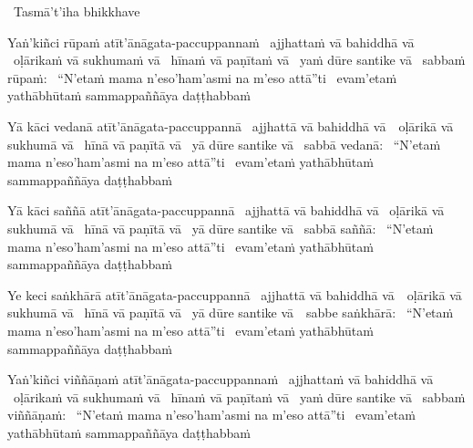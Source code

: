 \begin{pali-leader}
  \anglebracketleft\ \hspace{-0.5mm}Tasmā't'iha bhikkhave \hspace{-0.5mm}\anglebracketright\
\end{pali-leader}
\begin{pali-hangtogether}
  Yaṅ'kiñci rūpaṁ atīt'ānāgata-paccuppannaṁ \breathmark\ ajjhattaṁ vā bahiddhā vā \breathmark\ oḷārikaṁ vā sukhumaṁ vā \breathmark\ hīnaṁ vā paṇītaṁ vā \breathmark\ yaṁ dūre santike vā \breathmark\ sabbaṁ rūpaṁ: \breathmark\ ``N'etaṁ mama n'eso'ham'asmi na m'eso attā''ti \breathmark\ evam'etaṁ yathābhūtaṁ sammappaññāya daṭṭhabbaṁ
\end{pali-hangtogether}

\begin{pali-hang}
  Yā kāci vedanā atīt'ānāgata-paccuppannā \breathmark\ ajjhattā vā bahiddhā \mbox{vā}~\breathmark\ oḷārikā vā sukhumā vā \breathmark\ hīnā vā paṇītā vā \breathmark\ yā dūre santike vā \breathmark\ sabbā vedanā: \breathmark\ ``N'etaṁ mama n'eso'ham'asmi na m'eso attā''ti \breathmark\ evam'etaṁ yathābhūtaṁ sammappaññāya daṭṭhabbaṁ
\end{pali-hang}

\begin{pali-hang}
  Yā kāci saññā atīt'ānāgata-paccuppannā \breathmark\ ajjhattā vā bahiddhā vā \breathmark\ oḷārikā vā sukhumā vā \breathmark\ hīnā vā paṇītā vā \breathmark\ yā dūre santike vā \breathmark\ sabbā saññā: \breathmark\ ``N'etaṁ mama n'eso'ham'asmi na m'eso attā''ti \breathmark\ evam'etaṁ yathābhūtaṁ sammappaññāya daṭṭhabbaṁ
\end{pali-hang}

\begin{pali-hang}
  Ye keci saṅkhārā atīt'ānāgata-paccuppannā \breathmark\ ajjhattā vā bahiddhā \mbox{vā}~\breathmark\ oḷārikā vā sukhumā vā \breathmark\ hīnā vā paṇītā vā \breathmark\ yā dūre santike \mbox{vā}~\breathmark\ sabbe saṅkhārā: \breathmark\ ``N'etaṁ mama n'eso'ham'asmi na m'eso attā''ti \breathmark\ evam'etaṁ yathābhūtaṁ sammappaññāya daṭṭhabbaṁ
\end{pali-hang}

\begin{pali-hang}
  Yaṅ'kiñci viññāṇaṁ atīt'ānāgata-paccuppannaṁ \breathmark\ ajjhattaṁ vā bahiddhā vā \breathmark\ oḷārikaṁ vā sukhumaṁ vā \breathmark\ hīnaṁ vā paṇītaṁ vā \breathmark\ yaṁ dūre santike vā \breathmark\ sabbaṁ viññāṇaṁ: \breathmark\ ``N'etaṁ mama n'eso'ham'asmi na m'eso attā''ti \breathmark\ evam'etaṁ yathābhūtaṁ sammappaññāya daṭṭhabbaṁ
\end{pali-hang}

